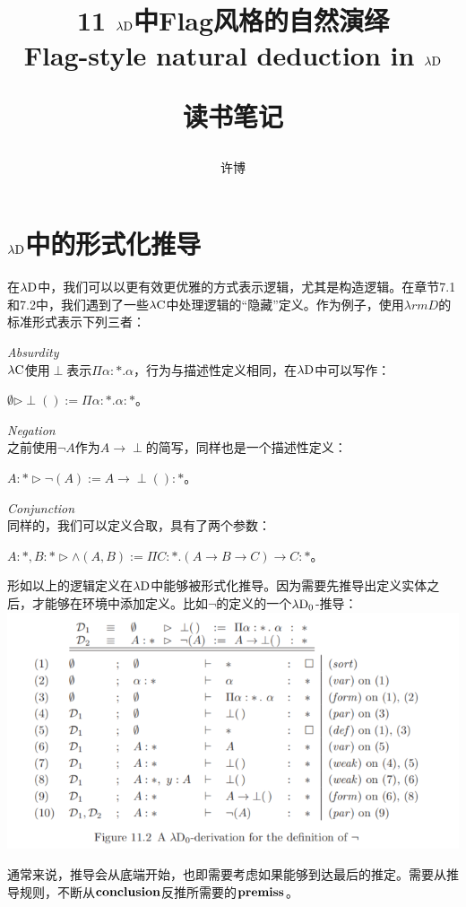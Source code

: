 \documentclass[UTF8]{article}
\title{11 $\lambda{\rm D}$中Flag风格的自然演绎\\Flag-style natural deduction in $\lambda{\rm D}$\\[2ex]\begin{large}读书笔记\end{large}}
\author{许博}
\date{}
\begin{document}
\maketitle
	\section{$\lambda{\rm D}$中的形式化推导}
	\noindent
	在$\lambda{\rm D}$中，我们可以以更有效更优雅的方式表示逻辑，尤其是构造逻辑。在章节7.1和7.2中，我们遇到了一些$\lambda{\rm C}$中处理逻辑的“隐藏”定义。作为例子，使用$\lambda{rm D}$的标准形式表示下列三者：
	
	\noindent
	\textit{Absurdity}\\
	$\lambda{\rm C}$使用$\perp$表示$\Pi\alpha:*.\alpha$，行为与描述性定义相同，在$\lambda{\rm D}$中可以写作：
	
		$\emptyset\triangleright\perp():=\Pi\alpha:*.\alpha:*$。
		
	\noindent
	\textit{Negation}\\
	之前使用$\neg A$作为$A\rightarrow\perp$的简写，同样也是一个描述性定义：
	
		$A:*\triangleright\neg(A):=A\rightarrow\perp():*$。
	
	\noindent
	\textit{Conjunction}\\
	同样的，我们可以定义合取，具有了两个参数：
	
		$A:*,B:*\triangleright\land(A,B):=\Pi C:*.(A\rightarrow B\rightarrow C)\rightarrow C:*$。
		
		形如以上的逻辑定义在$\lambda{\rm D}$中能够被形式化推导。因为需要先推导出定义实体之后，才能够在环境中添加定义。比如$\neg$的定义的一个$\lambda{\rm D_0}$-推导：\\
		\includegraphics[width=0.93\linewidth]{"../imgs/11-1.png"}
		
		通常来说，推导会从底端开始，也即需要考虑如果能够到达最后的推定。需要从推导规则，不断从$\bf conclusion$反推所需要的$\bf premiss$。
\end{document}
